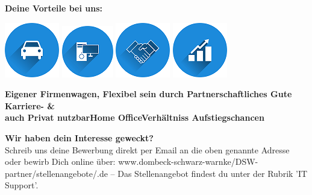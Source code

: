 \documentclass[12pt,utf8]{scrartcl}
\begin{document}
\begin{flushleft}
\begin{center}
	\textbf{Deine Vorteile bei uns:}
\end{center}

\begin{center}
	\includegraphics{images/auto}\label{fig:auto}\hspace{1,5cm}
	\includegraphics{images/home}\label{fig:home}\hspace{1,5cm}	
	\includegraphics{images/handshake}\label{fig:handshake}\hspace{1,5cm}		
	\includegraphics{images/statistics}\label{fig:statistics}  
\end{center}
\hspace{0,3cm}\textbf{Eigener Firmenwagen,\hspace{0,7cm} Flexibel sein durch \hspace{0,9cm}Partnerschaftliches \hspace{1,1cm}Gute Karriere- \& \\ \hspace{0,4cm}auch Privat nutzbar\hspace{1,5cm}Home Office\hspace{2,1cm}Verhältniss \hspace{2cm}Aufstiegschancen} 			

\vspace{1cm}
\textbf{Wir haben dein Interesse geweckt?}\\
Schreib uns deine Bewerbung direkt per Email an die oben genannte Adresse oder bewirb Dich online über: www.dombeck-schwarz-warnke/DSW-partner/stellenangebote/.de – Das Stellenangebot findest du unter der Rubrik 'IT Support'.

\normalsize
\newpage
{}


\end{flushleft}
\end{document}
